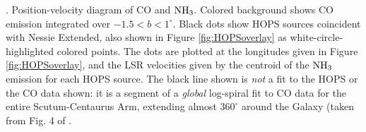 \textbf{\label{fig:pvdiagram}}. Position-velocity diagram of CO and ${\rm NH}_3$.  Colored background shows CO emission integrated over $-1.5<b<1^\circ$.  Black dots show HOPS sources coincident with Nessie Extended, also shown in Figure \ref{fig:HOPSoverlay} as white-circle-highlighted colored points.  The dots are plotted at the longitudes given in Figure \ref{fig:HOPSoverlay}, and the LSR velocities given by the centroid of the ${\rm NH}_3$ emission for each HOPS source. The black line shown is {\it not} a fit to the HOPS or the CO data shown: it is a segment of a {\it global} log-spiral fit to CO data for the entire Scutum-Centaurus Arm, extending almost $360^{\circ}$ around the Galaxy (taken from Fig. 4 of \cite{2011ApJ...734L..24D}. 